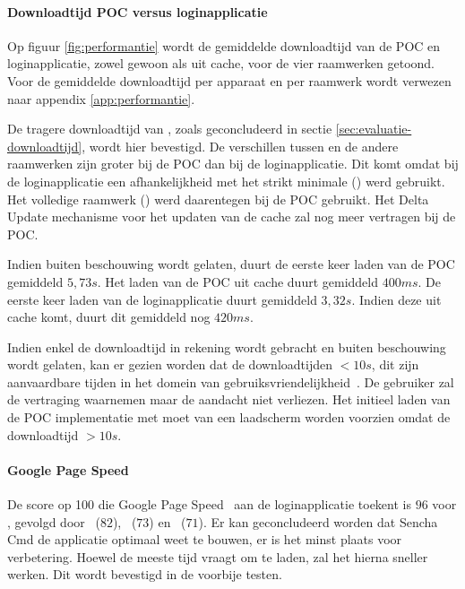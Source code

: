\paragraph{Downloadtijd POC versus loginapplicatie}
Op figuur \ref{fig:performantie} wordt de gemiddelde downloadtijd van de POC en loginapplicatie, zowel gewoon als uit cache, voor de vier raamwerken getoond.
Voor de gemiddelde downloadtijd per apparaat en per raamwerk wordt verwezen naar appendix \ref{app:performantie}.

De tragere downloadtijd van \st{},  zoals geconcludeerd in sectie \ref{sec:evaluatie-downloadtijd}, wordt hier bevestigd.
De verschillen tussen \st{} en de andere raamwerken zijn groter bij de POC dan bij de loginapplicatie.
Dit komt omdat bij de loginapplicatie een afhankelijkheid met het strikt minimale () werd gebruikt.  
Het volledige raamwerk () werd daarentegen bij de POC gebruikt.
Het Delta Update mechanisme voor het updaten van de cache zal \st{} nog meer vertragen bij de POC.

Indien \st{} buiten beschouwing wordt gelaten, duurt de eerste keer laden van de POC gemiddeld $5,73\unit{s}$. 
Het laden van de POC uit cache duurt gemiddeld $400\unit{ms}$.
De eerste keer laden van de loginapplicatie duurt gemiddeld $3,32\unit{s}$.
Indien deze uit cache komt, duurt dit gemiddeld nog $420\unit{ms}$.

Indien enkel de downloadtijd in rekening wordt gebracht en \st{} buiten beschouwing wordt gelaten, kan er gezien worden dat de downloadtijden $< 10\unit{s}$,  dit zijn aanvaardbare tijden in het domein van gebruiksvriendelijkheid~\cite{Nielsen1993}.
De gebruiker zal de vertraging waarnemen maar de aandacht niet verliezen.
Het initieel laden van de POC implementatie met \st{} moet van een laadscherm worden voorzien omdat de downloadtijd $> 10\unit{s}$.

\paragraph{Google Page Speed}
De score op 100 die Google Page Speed~\cite{Morgan2011} aan de loginapplicatie toekent is $96$ voor \st{}, gevolgd door \lungo{}~($82$),  \kendo{}~($73$) en \jqm{}~($71$).
Er kan geconcludeerd worden dat Sencha Cmd de applicatie optimaal weet te bouwen,  er is het minst plaats voor verbetering.
Hoewel \st{} de meeste tijd vraagt om te laden, zal het hierna sneller werken.
Dit wordt bevestigd in de voorbije testen.


